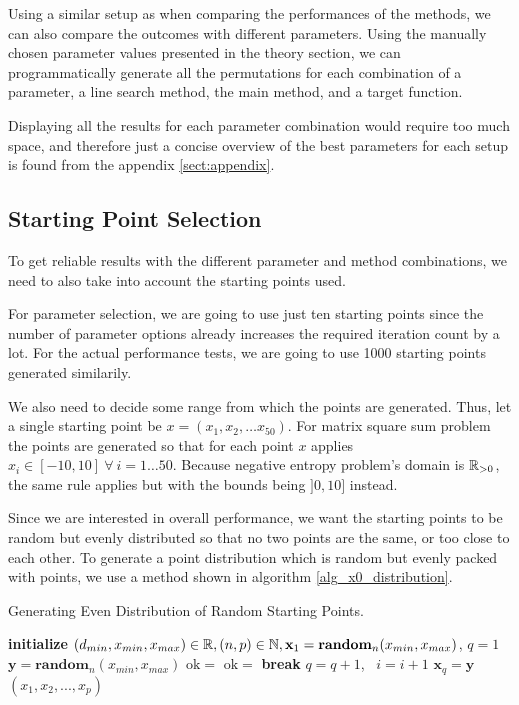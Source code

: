 \documentclass[a4paper,english,titlepage,12pt]{article}
\newcommand{\vect}[1]{\ensuremath{\mathbf{#1}}}
\newcommand{\norm}[1]{\ensuremath\Vert #1 \Vert}
\newcommand{\R}{\ensuremath\mathbb{R}}
\newcommand{\N}{\ensuremath\mathbb{N}}
\begin{document}
Using a similar setup as when comparing the performances of the methods, we can also compare the outcomes with different parameters. Using the manually chosen parameter values presented in the theory section, we can programmatically generate all the permutations for each combination of a parameter, a line search method, the main method, and a target function.

Displaying all the results for each parameter combination would require too much space, and therefore just a concise overview of the best parameters for each setup is found from the appendix \ref{sect:appendix}.

\subsection{Starting Point Selection}

To get reliable results with the different parameter and method combinations, we need to also take into account the starting points used.

For parameter selection, we are going to use just ten starting points since the number of parameter options already increases the required iteration count by a lot. For the actual performance tests, we are going to use 1000 starting points generated similarily.

We also need to decide some range from which the points are generated. Thus, let a single starting point be $x = (x_1, x_2, \dots x_{50})$. For matrix square sum problem the points are generated so that for each point $x$ applies $x_i \in  [-10, 10]\ \forall\ i = 1 \dots 50$. Because negative entropy problem's domain is $\R_{>0}$, the same rule applies but with the bounds being $]0, 10]$ instead.

Since we are interested in overall performance, we want the starting points to be random but evenly distributed so that no two points are the same, or too close to each other. To generate a point distribution which is random but evenly packed with points, we use a method shown in algorithm \ref{alg_x0_distribution}.

\begin{algorithm}[H]
\caption{Generating Even Distribution of Random Starting Points.}
\label{alg_x0_distribution}
\begin{algorithmic}[1]
\STATE \textbf{initialize} $(d_{min}, x_{min}, x_{max}) \in \R, (n, p) \in \N, \vect{x}_1 = \mathbf{random}_{n}(x_{min}, x_{max})$, $q = 1$
    \STATE $\vect{y} = \mathbf{random}_{n}(x_{min}, x_{max})$
    \STATE $\mathrm{ok} =$ \TRUE
        \IF{$\norm{\vect{x}_j - \vect{y}} < d_{min}$}
            \STATE $\mathrm{ok} = $ \FALSE
            \STATE \textbf{break}
        \ENDIF
    \ENDFOR
        \STATE $q = q + 1$, \ $i = i + 1$
        \STATE $\vect{x}_q = \vect{y}$
    \ENDIF
\ENDWHILE
\RETURN $(x_1, x_2, ..., x_p)$
\end{algorithmic}
\end{algorithm}
\end{document}
